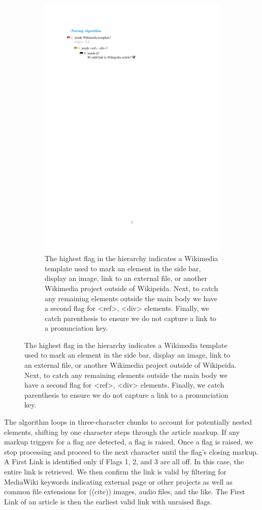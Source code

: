 \documentclass[twoside]{article}
\begin{document}
\begin{figure}[H]
\centering
\caption{parsing algorithm of Wikipedia's XML dump}
    \begin{subfigure}[b]{0.5\textwidth}
        \includegraphics[width=\textwidth]{graphics/flags.pdf}    
        \caption{ The highest flag in the hierarchy indicates a Wikimedia template used to mark an element in the side bar, display an image, link to an external file, or another Wikimedia project outside of Wikipeida. Next, to catch any remaining elements outside the main body we have a second flag for <ref>, <div> elements. Finally, we catch parenthesis to ensure we do not capture a link to a pronunciation key.}
    \end{subfigure}

\end{figure}

The algorithm loops in three-character chunks to account for potentially nested elements, 
shifting by one character steps through the article markup.
If any markup triggers for a flag are detected, a flag is raised. 
Once a flag is raised, we stop processing and proceed to the next character
until the flag's closing markup.
A First Link is identified only if Flags 1, 2, and 3 are all off.
In this case, the entire link is retrieved. 
We then confirm the link is valid by filtering for MediaWiki keywords indicating external page or other projects
as well as common file extensions for 
((cite))
images, audio files, and the like.
The First Link of an article is then the earliest valid link with unraised flags.
\end{document}
